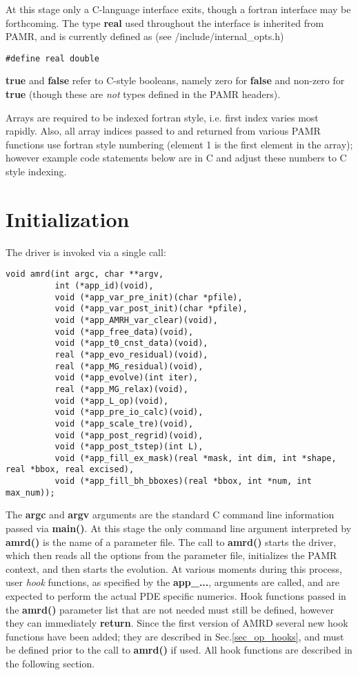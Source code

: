 \documentclass[aps,amssymb,unsortedaddress,nofootinbib]{revtex4}
\begin{document}
At this stage only
a C-language interface exits, though a fortran interface may be forthcoming.
The type {\bf real} used throughout the interface is inherited from PAMR, and
is currently defined as (see {\rm /include/internal\_opts.h})
\begin{verbatim}
#define real double
\end{verbatim}
{\bf true} and {\bf false} refer to C-style booleans, namely zero for
{\bf false} and non-zero for {\bf true} (though these are {\em not} 
types defined in the PAMR headers).
\par
Arrays are required to be indexed fortran style, i.e. first index
varies most rapidly. Also, all array indices passed to and returned from
various PAMR functions use fortran style numbering (element 1 is the first 
element in the array); however example code statements below are in C and
adjust these numbers to C style indexing.


\section{Initialization}\label{sec_init}

The driver is invoked via a single call:

\begin{verbatim}
void amrd(int argc, char **argv,
          int (*app_id)(void),
          void (*app_var_pre_init)(char *pfile),
          void (*app_var_post_init)(char *pfile),
          void (*app_AMRH_var_clear)(void),
          void (*app_free_data)(void),
          void (*app_t0_cnst_data)(void),
          real (*app_evo_residual)(void),
          real (*app_MG_residual)(void),
          void (*app_evolve)(int iter),
          real (*app_MG_relax)(void),
          void (*app_L_op)(void),
          void (*app_pre_io_calc)(void),
          void (*app_scale_tre)(void),
          void (*app_post_regrid)(void),
          void (*app_post_tstep)(int L),
          void (*app_fill_ex_mask)(real *mask, int dim, int *shape, real *bbox, real excised),
          void (*app_fill_bh_bboxes)(real *bbox, int *num, int max_num));
\end{verbatim}

The {\bf argc} and {\bf argv} arguments are the standard C command line information
passed via {\bf main()}. At this stage the only command line argument interpreted by 
{\bf amrd()} is the name of a parameter file. The call to {\bf amrd()} starts the driver,
which then reads all the options from the parameter file, initializes the PAMR context,
and then starts the evolution. At various moments during this process, user {\em hook}
functions, as specified by the {\bf app\_...}, arguments are called, and are expected
to perform the actual PDE specific numerics. Hook functions passed in the {\bf amrd()} 
parameter list that are not needed
must still be defined, however they can immediately {\bf return}. Since the first
version of AMRD several new hook functions have been added; they are
described in Sec.\ref{sec_op_hooks}, and must be defined prior to the call to
{\bf amrd()} if used.
All hook functions are described in the following section.
\end{document}

